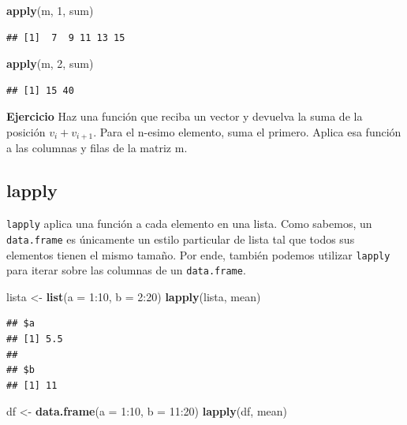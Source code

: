 \documentclass[]{article}
\newenvironment{Shaded}{\begin{snugshade}}{\end{snugshade}}
\newcommand{\KeywordTok}[1]{\textcolor[rgb]{0.13,0.29,0.53}{\textbf{{#1}}}}
\newcommand{\DataTypeTok}[1]{\textcolor[rgb]{0.13,0.29,0.53}{{#1}}}
\newcommand{\DecValTok}[1]{\textcolor[rgb]{0.00,0.00,0.81}{{#1}}}
\newcommand{\StringTok}[1]{\textcolor[rgb]{0.31,0.60,0.02}{{#1}}}
\newcommand{\NormalTok}[1]{{#1}}
\begin{document}
\begin{Shaded}
\begin{Highlighting}[]
\KeywordTok{apply}\NormalTok{(m, }\DecValTok{1}\NormalTok{, sum)}
\end{Highlighting}
\end{Shaded}

\begin{verbatim}
## [1]  7  9 11 13 15
\end{verbatim}

\begin{Shaded}
\begin{Highlighting}[]
\KeywordTok{apply}\NormalTok{(m, }\DecValTok{2}\NormalTok{, sum)}
\end{Highlighting}
\end{Shaded}

\begin{verbatim}
## [1] 15 40
\end{verbatim}

\textbf{Ejercicio} Haz una función que reciba un vector y devuelva la
suma de la posición \(v_i + v_{i + 1}\). Para el n-esimo elemento, suma
el primero. Aplica esa función a las columnas y filas de la matriz m.

\subsection{lapply}\label{lapply}

\texttt{lapply} aplica una función a cada elemento en una lista. Como
sabemos, un \texttt{data.frame} es únicamente un estilo particular de
lista tal que todos sus elementos tienen el mismo tamaño. Por ende,
también podemos utilizar \texttt{lapply} para iterar sobre las columnas
de un \texttt{data.frame}.

\begin{Shaded}
\begin{Highlighting}[]
\NormalTok{lista <-}\StringTok{ }\KeywordTok{list}\NormalTok{(}\DataTypeTok{a =} \DecValTok{1}\NormalTok{:}\DecValTok{10}\NormalTok{, }\DataTypeTok{b =} \DecValTok{2}\NormalTok{:}\DecValTok{20}\NormalTok{)}
\KeywordTok{lapply}\NormalTok{(lista, mean)}
\end{Highlighting}
\end{Shaded}

\begin{verbatim}
## $a
## [1] 5.5
## 
## $b
## [1] 11
\end{verbatim}

\begin{Shaded}
\begin{Highlighting}[]
\NormalTok{df <-}\StringTok{ }\KeywordTok{data.frame}\NormalTok{(}\DataTypeTok{a =} \DecValTok{1}\NormalTok{:}\DecValTok{10}\NormalTok{, }\DataTypeTok{b =} \DecValTok{11}\NormalTok{:}\DecValTok{20}\NormalTok{)}
\KeywordTok{lapply}\NormalTok{(df, mean)}
\end{Highlighting}
\end{Shaded}
\end{document}
